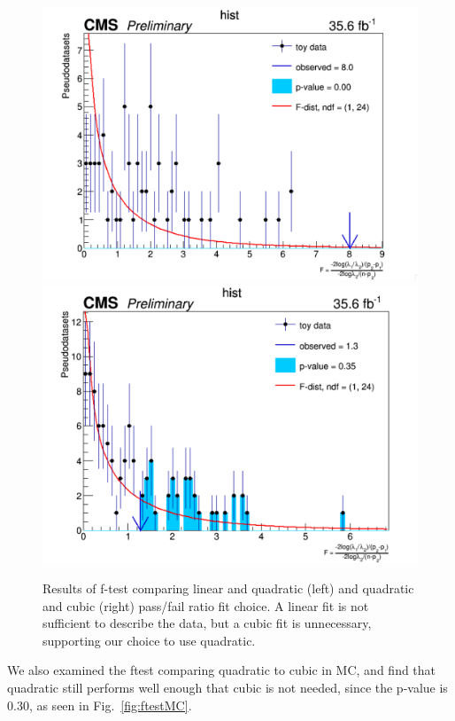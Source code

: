\begin{figure}[thb!]
\begin{center}
\includegraphics[scale=0.25]{Figures/ftestlinquad.pdf}
\includegraphics[scale=0.25]{Figures/ftestquadcub.pdf}
\end{center}
\caption{Results of f-test comparing linear and quadratic (left) and quadratic and cubic (right) pass/fail ratio fit choice. A linear fit is not sufficient to describe the data, but a cubic fit is unnecessary, supporting our choice to use quadratic.}
\label{fig:ftest}
\end{figure}

We also examined the ftest comparing quadratic to cubic in MC, and find that quadratic still performs well enough that cubic is not needed, since the p-value is 0.30, as seen in Fig.~\ref{fig:ftestMC}.

